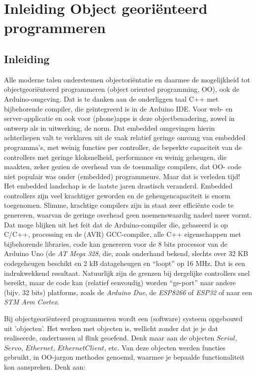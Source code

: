 \chapter{Inleiding Object georiënteerd programmeren}

\section{Inleiding}
Alle moderne talen ondersteunen objectoriëntatie en daarmee de mogelijkheid tot objectgeoriënteerd programmeren (object oriented programming, OO), ook de Arduino-omgeving. Dat is te danken aan de onderliggen taal C++ met bijbehorende compiler, die geïntegreerd is in de Arduino IDE. Voor web- en server-applicatie en ook voor (phone)apps is deze objectbenadering, zowel in ontwerp als in uitwerking, de norm. Dat embedded omgevingen hierin achterliepen valt te verklaren uit de vaak relatief geringe omvang van embedded programma’s, met weinig functies per controller, de beperkte capaciteit van de controllers met geringe kloksnelheid, performance en weinig geheugen, die maakten, zeker gezien de overhead van de toenmalige compilers, dat OO- code niet populair was onder (embedded) programmeurs. Maar dat is verleden tijd! \newline 
Het embedded landschap is de laatste jaren drastisch veranderd. Embedded controllers zijn veel krachtiger geworden en de geheugencapaciteit is enorm toegenomen. Slimme, krachtige compilers zijn in staat zeer efficiënte code te genereren, waarvan de geringe overhead geen noemenswaardig nadeel meer vormt. Dat moge blijken uit het feit dat de Arduino-compiler die, gebaseerd is op C/C++, processing en de (AVR) GCC-compiler, alle C++ eigenschappen met bijbehorende libraries, code kan genereren voor de 8 bits processor van de Arduino Uno (de \textit{AT Mega 328}, die, zoals onderhand bekend, slechts over 32 KB codegeheugen beschikt en 2 kB datageheugen en “loopt” op 16 MHz. Dat is een indrukwekkend resultaat.\newline 
Natuurlijk zijn de grenzen bij dergelijke controllers snel bereikt, maar de code kan (relatief eenvoudig) worden “ge-port” naar andere (bijv. 32 bits) platforms, zoals de \textit{Arduino Due}, de \textit{ESP8266} of \textit{ESP32} of naar een \textit{STM Arm Cortex}. \newline \newline

Bij objectgeoriënteerd programmeren wordt een (software) systeem opgebouwd uit 'objecten'. Het werken met objecten is, wellicht zonder dat je je dat realiseerde, ondertussen al flink geoefend. Denk maar aan de objecten $Serial$, $Servo$, $Ethernet$, $EthernetClient$, etc. Van deze objecten werden functies gebruikt, in OO-jargon methodes genoemd, waarmee je bepaalde functionaliteit kon aanspreken. Denk aan:

